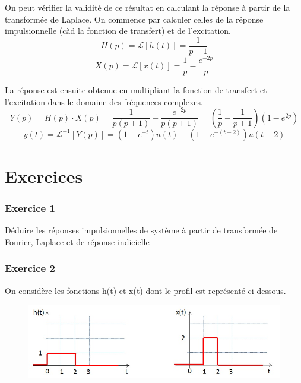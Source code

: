 	\vspace{1\baselineskip}
	
	On peut vérifier la validité de ce résultat en calculant la réponse à partir de la transformée de Laplace. On commence par calculer celles de la réponse impulsionnelle (càd la fonction de transfert) et de l'excitation.
	\begin{equation}\label{key}
	H(p)=\mathcal{L}[h(t)]=\frac{1}{p+1}
	\end{equation}
	\begin{equation}\label{key}
	X(p)=\mathcal{L}[x(t)]=\frac{1}{p}-\frac{e^{-2p}}{p}
	\end{equation}
	
	La réponse est ensuite obtenue en multipliant la fonction de transfert et l'excitation dans le domaine des fréquences complexes.
	\begin{equation*}
	Y(p)=H(p)\cdot X(p)=\frac{1}{p(p+1)}-\frac{e^{-2p}}{p(p+1)}=(\frac{1}{p}-\frac{1}{p+1})(1-e^{2p})
	\end{equation*}
	\begin{equation*}
	y(t)=\mathcal{L}^{-1}[Y(p)]=(1-e^{-t})u(t)-(1-e^{-(t-2)})u(t-2)
	\end{equation*}
	
	\vspace{1\baselineskip}
	
	
	
	\section{Exercices}
	
		\subsubsection{Exercice 1}
	
	Déduire les réponses impulsionnelles de système à partir de transformée de Fourier, Laplace et de réponse indicielle
	
	\subsubsection{Exercice 2}
	
	On considère les fonctions h(t) et x(t) dont le profil est représenté ci-dessous.
	\begin{figure}[h!]
		\centering
		\includegraphics[scale=0.5]{images/Courbes_TD_Convolution_2.jpg} 
	\end{figure}
	
